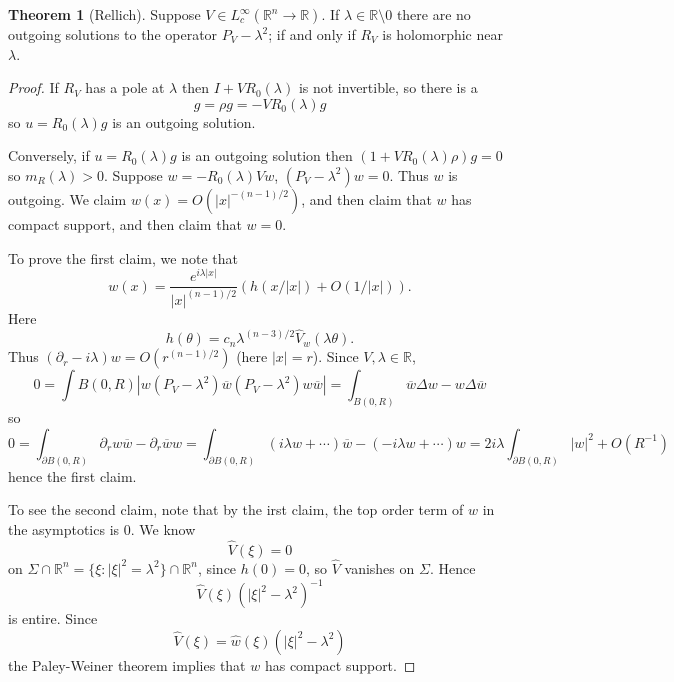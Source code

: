 \documentclass[12pt]{report}
\newcommand{\RR}{\mathbb{R}}
\theoremstyle{definition}
\newtheorem{theorem}{Theorem}[chapter]
\begin{document}
\begin{theorem}[Rellich]
Suppose $V \in L^\infty_c(\RR^n \to \RR)$. If $\lambda \in \RR \setminus 0$ there are no outgoing solutions to the operator $P_V - \lambda^2$; if and only if $R_V$ is holomorphic near $\lambda$.
\end{theorem}
\begin{proof}
If $R_V$ has a pole at $\lambda$ then $I + VR_0(\lambda)$ is not invertible, so there is a
$$g = \rho g = -VR_0(\lambda)g$$
so $u = R_0(\lambda)g$ is an outgoing solution.

Conversely, if $u = R_0(\lambda)g$ is an outgoing solution then $(1 + VR_0(\lambda)\rho)g = 0$ so $m_R(\lambda) > 0$.
Suppose $w = -R_0(\lambda)Vw$, $(P_V - \lambda^2)w = 0$. Thus $w$ is outgoing.
We claim $w(x) = O(|x|^{-(n-1)/2})$, and then claim that $w$ has compact support, and then claim that $w = 0$.

To prove the first claim, we note that
$$w(x) = \frac{e^{i\lambda|x|}}{|x|^{(n-1)/2}}(h(x/|x|) + O(1/|x|)).$$
Here
$$h(\theta) = c_n \lambda^{(n-3)/2}\hat V_w(\lambda\theta).$$
Thus $(\partial_r - i\lambda)w = O(r^{(n-1)/2})$ (here $|x| = r$).
Since $V,\lambda \in \RR$,
$$0 = \int{B(0, R)} |w(P_V - \lambda^2)\overline w (P_V - \lambda^2)w\overline w| = \int_{B(0, R)} \overline w\Delta w - w \Delta \overline w$$
so
$$0 = \int_{\partial B(0, R)} \partial_rw\overline w - \partial_r\overline ww = \int_{\partial B(0, R)} (i\lambda w + \cdots)\overline w - (-i\lambda w + \cdots)w = 2i\lambda \int_{\partial B(0, R)} |w|^2 + O(R^{-1})$$
hence the first claim.

To see the second claim, note that by the irst claim, the top order term of $w$ in the asymptotics is $0$.
We know
$$\hat V(\xi) = 0$$
on $\Sigma \cap \RR^n = \{\xi: |\xi|^2 = \lambda^2\} \cap \RR^n$, since $h(0) = 0$, so $\hat V$ vanishes on $\Sigma$. Hence
$$\hat V(\xi)(|\xi|^2 - \lambda^2)^{-1}$$
is entire. Since
$$\hat V(\xi) = \hat w(\xi)(|\xi|^2 - \lambda^2)$$
the Paley-Weiner theorem implies that $w$ has compact support.


\end{proof}
\end{document}

